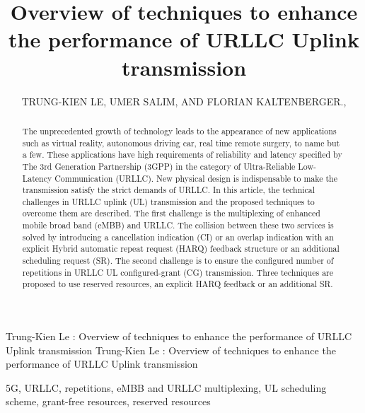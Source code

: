 \documentclass{ieeeaccess}
\begin{document}

\title{Overview of techniques to enhance the performance of URLLC Uplink transmission}
\author{\uppercase{Trung-Kien Le},
\uppercase{Umer Salim, and Florian Kaltenberger}.,
}
\address[1]{EURECOM, Sophia Anitpolis, France (e-mail: author@eurecom.fr)}
\address[2]{TCL Mobile, Sophia Antipolis, France (e-mail: author@tcl.com)}


\markboth
{Trung-Kien Le \headeretal: Overview of techniques to enhance the performance of URLLC Uplink transmission}
{Trung-Kien Le \headeretal: Overview of techniques to enhance the performance of URLLC Uplink transmission}


\begin{abstract}
The unprecedented growth of technology leads to the appearance of new applications such as virtual reality, autonomous driving car, real time remote surgery, to name but a few. These applications have high requirements of reliability and latency specified by The 3rd Generation Partnership (3GPP) in the category of Ultra-Reliable Low-Latency Communication (URLLC). New physical design is indispensable to make the transmission satisfy the strict demands of URLLC. In this article, the technical challenges in URLLC uplink (UL) transmission and the proposed techniques to overcome them are described. The first challenge is the multiplexing of enhanced mobile broad band (eMBB) and URLLC. The collision between these two services is solved by introducing a cancellation indication (CI) or an overlap indication with an explicit Hybrid automatic repeat request (HARQ) feedback structure or an additional scheduling request (SR). The second challenge is to ensure the configured number of repetitions in URLLC UL configured-grant (CG) transmission. Three techniques are proposed to use reserved resources, an explicit HARQ feedback or an additional SR.
\end{abstract}

\begin{keywords}
5G, URLLC, repetitions, eMBB and URLLC multiplexing, UL scheduling scheme, grant-free resources, reserved resources
\end{keywords}
\end{document}
